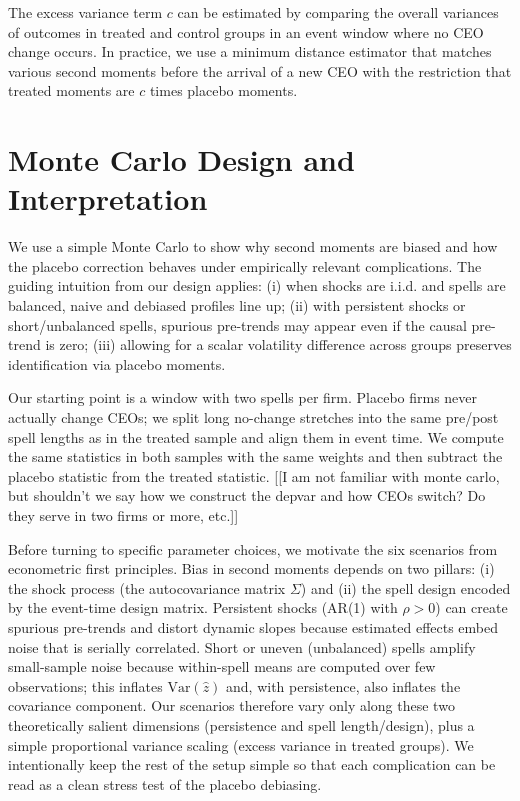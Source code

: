 \documentclass[11pt,a4paper]{article}
\newcommand{\Var}{\text{Var}}
\begin{document}
The excess variance term $c$ can be estimated by comparing the overall variances of outcomes in treated and control groups in an event window where no CEO change occurs. In practice, we use a minimum distance estimator that matches various second moments before the arrival of a new CEO with the restriction that treated moments are $c$ times placebo moments. 

\section{Monte Carlo Design and Interpretation}

We use a simple Monte Carlo to show why second moments are biased and how the placebo correction behaves under empirically relevant complications. The guiding intuition from our design applies: (i) when shocks are i.i.d. and spells are balanced, naive and debiased profiles line up; (ii) with persistent shocks or short/unbalanced spells, spurious pre-trends may appear even if the causal pre-trend is zero; (iii) allowing for a scalar volatility difference across groups preserves identification via placebo moments.

Our starting point is a window with two spells per firm. Placebo firms never actually change CEOs; we split long no-change stretches into the same pre/post spell lengths as in the treated sample and align them in event time. We compute the same statistics in both samples with the same weights and then subtract the placebo statistic from the treated statistic. [[I am not familiar with monte carlo, but shouldn't we say how we construct the depvar and how CEOs switch? Do they serve in two firms or more, etc.]]

Before turning to specific parameter choices, we motivate the six scenarios from econometric first principles. Bias in second moments depends on two pillars: (i) the shock process (the autocovariance matrix \(\Sigma\)) and (ii) the spell design encoded by the event-time design matrix. Persistent shocks (AR(1) with \(\rho>0\)) can create spurious pre-trends and distort dynamic slopes because estimated effects embed noise that is serially correlated. Short or uneven (unbalanced) spells amplify small-sample noise because within-spell means are computed over few observations; this inflates \(\Var(\hat z)\) and, with persistence, also inflates the covariance component. Our scenarios therefore vary only along these two theoretically salient dimensions (persistence and spell length/design), plus a simple proportional variance scaling (excess variance in treated groups). We intentionally keep the rest of the setup simple so that each complication can be read as a clean stress test of the placebo debiasing.
\end{document}
